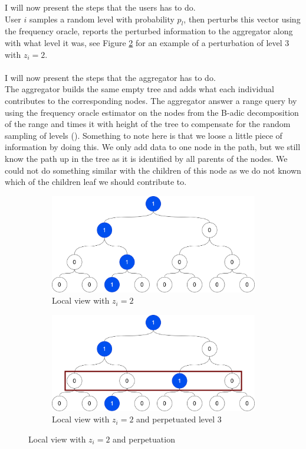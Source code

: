 \documentclass[11pt]{article}
\theoremstyle{definition}
\begin{document}
\noindent I will now present the steps that the users has to do. \\
User $i$ samples a random level with probability $p_l$, then 
perturbs this vector using the frequency oracle, reports the perturbed information to the aggregator along with what level it was, see Figure \ref{fig:sub2} for an example of a perturbation of level 3 with $z_i=2$. \\ \\
\noindent I will now present the steps that the aggregator has to do. \\
The aggregator builds the same empty tree and adds what each individual contributes to the corresponding nodes. The aggregator answer a range query by using the frequency oracle estimator on the nodes from the B-adic decomposition of the range and times it with height of the tree to compensate for the random sampling of levels (\cite[5]{local}). Something to note here is that we loose a little piece of information by doing this. We only add data to one node in the path, but we still know the path up in the tree as it is identified by all parents of the nodes. We could not do something similar with the children of this node as we do not known which of the children leaf we should contribute to. 

\begin{figure}[H]
\centering
\begin{subfigure}{.5\textwidth}
  \centering
  \includegraphics[width=.8\linewidth]{figures/binary_tree_path_1.png}
  \caption{Local view with $z_i=2$}
  \label{fig:sub1}
\end{subfigure}%
\begin{subfigure}{.5\textwidth}
  \centering
  \includegraphics[width=.8\linewidth]{figures/binary_tree_path_1_sample.png}
  \caption{Local view with $z_i=2$ and perpetuated level 3}
  \label{fig:sub2}
\end{subfigure}
\caption{Local view with $z_i=2$ and perpetuation}
\label{fig:binary_tree}
\end{figure}
\end{document}
